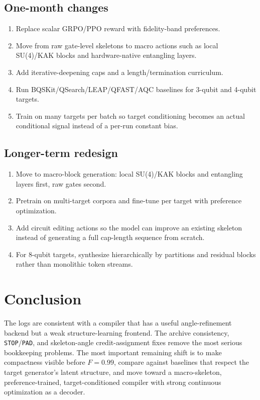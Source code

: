 \documentclass[11pt]{article}
\begin{document}
\subsection{One-month changes}

\begin{enumerate}
  \item Replace scalar GRPO/PPO reward with fidelity-band preferences.
  \item Move from raw gate-level skeletons to macro actions such as local
  SU(4)/KAK blocks and hardware-native entangling layers.
  \item Add iterative-deepening caps and a length/termination curriculum.
  \item Run BQSKit/QSearch/LEAP/QFAST/AQC baselines for 3-qubit and 4-qubit
  targets.
  \item Train on many targets per batch so target conditioning becomes an
  actual conditional signal instead of a per-run constant bias.
\end{enumerate}

\subsection{Longer-term redesign}

\begin{enumerate}
  \item Move to macro-block generation: local SU(4)/KAK blocks and entangling
  layers first, raw gates second.
  \item Pretrain on multi-target corpora and fine-tune per target with
  preference optimization.
  \item Add circuit editing actions so the model can improve an existing
  skeleton instead of generating a full cap-length sequence from scratch.
  \item For 8-qubit targets, synthesize hierarchically by partitions and
  residual blocks rather than monolithic token streams.
\end{enumerate}

\section{Conclusion}

The logs are consistent with a compiler that has a useful angle-refinement
backend but a weak structure-learning frontend.  The archive consistency,
\texttt{STOP}/\texttt{PAD}, and skeleton-angle credit-assignment fixes remove
the most serious bookkeeping problems.  The most important remaining shift is
to make compactness visible before \(F=0.99\), compare against baselines that
respect the target generator's latent structure, and move toward a
macro-skeleton, preference-trained, target-conditioned compiler with strong
continuous optimization as a decoder.
\end{document}

